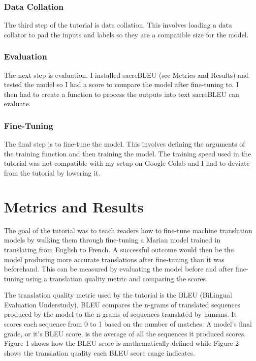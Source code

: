 \documentclass[10pt,twocolumn]{article}
\begin{document}
\subsubsection{Data Collation}
\hspace{\parindent}The third step of the tutorial is data collation. This involves loading a data collator to pad the inputs and labels so they are a compatible size for the model. 

\subsubsection{Evaluation}
\hspace{\parindent}The next step is evaluation. I installed sacreBLEU (see Metrics and Results) and tested the model so I had a score to compare the model after fine-tuning to. I then had to create a function to process the outputs into text sacreBLEU can evaluate.

\subsubsection{Fine-Tuning}
\hspace{\parindent}The final step is to fine-tune the model. This involves defining the arguments of the training function and then training the model. The training speed used in the tutorial was not compatible with my setup on Google Colab and I had to deviate from the tutorial by lowering it. 

\section{Metrics and Results}
The goal of the tutorial was to teach readers how to fine-tune machine translation models by walking them through fine-tuning a Marian model trained in translating from English to French. A successful outcome would then be the model producing more accurate translations after fine-tuning than it was beforehand. This can be measured by evaluating the model before and after fine-tuning using a translation quality metric and comparing the scores. 

The translation quality metric used by the tutorial is the BLEU (BiLingual Evaluation Understudy). BLEU compares the n-grams of translated sequences produced by the model to the n-grams of sequences translated by humans. It scores each sequence from 0 to 1 based on the number of matches. A model's final grade, or it's BLEU score, is the average of all the sequences it produced scores. Figure 1 shows how the BLEU score is mathematically defined while Figure 2 shows the translation quality each BLEU score range indicates.
\end{document}
